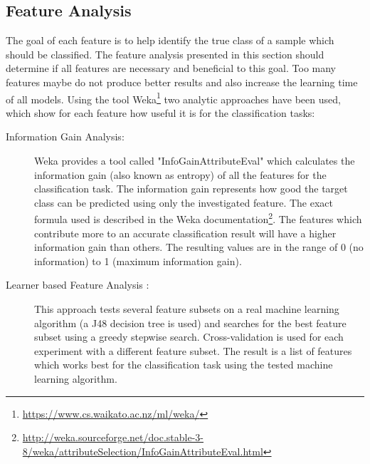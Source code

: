 \subsection{Feature Analysis}
\label{sec:feature_analysis}

The goal of each feature is to help identify the true class of a sample which should be classified. The feature analysis presented in this section should determine if all features are necessary and beneficial to this goal. Too many features maybe do not produce better results and also increase the learning time of all models. Using the tool Weka\footnote{\url{https://www.cs.waikato.ac.nz/ml/weka/}} two analytic approaches have been used, which show for each feature how useful it is for the classification tasks:


\begin{description}

\item[Information Gain Analysis:] Weka provides a tool called "InfoGainAttributeEval" which calculates the information gain (also known as entropy) of all the features for the classification task. The information gain represents how good the target class can be predicted using only the investigated feature. The exact formula used is described in the Weka documentation\footnote{\url{http://weka.sourceforge.net/doc.stable-3-8/weka/attributeSelection/InfoGainAttributeEval.html}}. The features which contribute more to an accurate classification result will have a higher information gain than others. The resulting values are in the range of 0 (no information) to 1 (maximum information gain).

\item[Learner based Feature Analysis \cite{Kohavi1997_Weka_Wrapper_subset_eval}:] This approach tests several feature subsets on a real machine learning algorithm (a J48 decision tree is used) and searches for the best feature subset using a greedy stepwise search. Cross-validation is used for each experiment with a different feature subset. The result is a list of features which works best for the classification task using the tested machine learning algorithm. %

\end{description}


